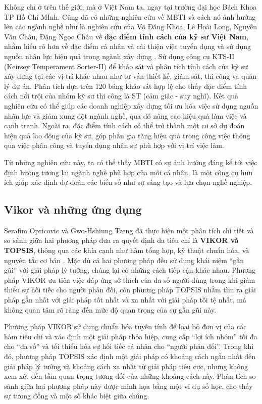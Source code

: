 Không chỉ ở trên thế giới, mà ở Việt Nam ta, ngay tại trường đại học Bách Khoa TP Hồ Chí MInh. Cũng đã có những nghiên cứu về MBTI và cách nó ảnh hưởng lên các ngành nghề như là nghiên cứu của Võ Đăng Khoa, Lê Hoài Long, Nguyễn Văn Châu, Đặng Ngọc Châu về \textbf{đặc điểm tính cách của kỹ sư Việt Nam}, nhằm hiểu rõ hơn về đặc điểm cá nhân và cải thiện việc tuyển dụng và sử dụng nguồn nhân lực hiệu quả trong ngành xây dựng \cite{khoa}.  Sử dụng công cụ KTS-II (Keirsey Temperament Sorter-II) để khảo sát và phân tích tính cách của kỹ sư xây dựng tại các vị trí khác nhau như tư vấn thiết kế, giám sát, thi công và quản lý dự án. Phân tích dựa trên 120 bảng khảo sát hợp lệ cho thấy đặc điểm tính cách nổi trội của nhóm kỹ sư thi công là ST (cảm giác - suy nghĩ). Kết quả nghiên cứu có thể giúp các doanh nghiệp xây dựng tối ưu hóa việc sử dụng nguồn nhân lực và giảm xung đột ngành nghề, qua đó nâng cao hiệu quả làm việc và cạnh tranh. Ngoài ra, đặc điểm tính cách có thể trở thành một cơ sở dự đoán hiệu quả lao động của kỹ sư, góp phần gia tăng hiệu  quả trong công việc thông qua việc phân công và tuyển dụng nhân sự phù hợp với vị trí việc làm.

Từ những nghiên cứu này, ta có thể thấy MBTI có sự ảnh hưởng đáng kể tới việc định hướng tương lai ngành nghề phù hợp của mỗi cá nhân, là một công cụ hữu ích giúp xác định dự đoán các biến số như sự sáng tạo và lựa chọn nghề nghiệp.

\subsection{Vikor và những ứng dụng}
Serafim Opricovic và Gwo-Hshiung Tzeng đã thực hiện một phân tích chi tiết và so sánh giữa hai phương pháp đưa ra quyết định đa tiêu chí là \textbf{VIKOR và TOPSIS}, thông qua các khía cạnh như hàm tổng hợp, kỹ thuật chuẩn hóa, và nguyên tắc cơ bản \cite{serafim}. Mặc dù cả hai phương pháp đều sử dụng khái niệm “gần gũi” với giải pháp lý tưởng, chúng lại có những cách tiếp cận khác nhau. Phương pháp VIKOR ưu tiên việc đáp ứng sở thích của đa số người dùng trong khi giảm thiểu sự hối tiếc cho người phản đối, còn phương pháp TOPSIS nhằm tìm ra giải pháp gần nhất với giải pháp tốt nhất và xa nhất với giải pháp tồi tệ nhất, mà không quan tâm rõ ràng đến mức độ quan trọng của sự gần gũi này.

Phương pháp VIKOR sử dụng chuẩn hóa tuyến tính để loại bỏ đơn vị của các hàm tiêu chí và xác định một giải pháp thỏa hiệp, cung cấp “lợi ích nhóm” tối đa cho “đa số” và tối thiểu hóa sự hối tiếc cá nhân cho “người phản đối”. Trong khi đó, phương pháp TOPSIS xác định một giải pháp có khoảng cách ngắn nhất đến giải pháp lý tưởng và khoảng cách xa nhất từ giải pháp tiêu cực, nhưng không xem xét đến tầm quan trọng tương đối của những khoảng cách này. Phân tích so sánh giữa hai phương pháp này được minh họa bằng một ví dụ số học, cho thấy sự tương đồng và một số khác biệt giữa chúng.

